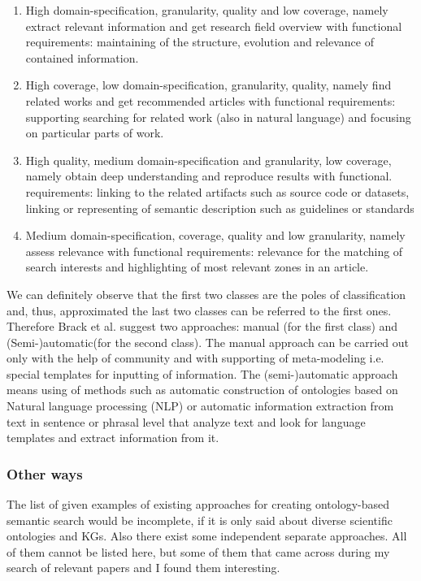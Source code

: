 			\begin{enumerate}
				\item High domain-specification, granularity, quality and low coverage, namely extract relevant information and get research field overview with functional requirements: maintaining of the structure, evolution and relevance of contained information.  
				\item High coverage, low domain-specification, granularity, quality, namely find related works and get recommended articles with functional requirements: supporting searching for related work (also in natural language) and focusing on particular parts of work. 
				\item High quality, medium domain-specification and granularity, low coverage, namely obtain deep understanding and reproduce results with functional. requirements: linking to the related artifacts such as source code or datasets, linking or representing of semantic description such as guidelines or standards
				\item Medium domain-specification, coverage, quality and low granularity, namely assess relevance with functional requirements: relevance for the matching of search interests and highlighting of most relevant zones in an article. 
			\end{enumerate} 
		We can definitely observe that the first two classes are the poles of classification and, thus, approximated the last two classes can be referred to the first ones. Therefore Brack et al. \cite{Bra20} suggest two approaches: manual (for the first class) and (Semi-)automatic(for the second class). The manual approach can be carried out only with the help of community and with supporting of meta-modeling i.e. special templates for inputting of information. The (semi-)automatic approach means using of methods such as automatic construction of ontologies based on Natural language processing (NLP) or automatic information extraction from text in sentence or phrasal level that analyze text and look for language templates and extract information from it.
		
		\subsubsection{Other ways}
		The list of given examples of existing approaches for creating ontology-based semantic search would be incomplete, if it is only said about diverse scientific ontologies and KGs. Also there exist some independent separate approaches. All of them cannot be listed here, but some of them that came across during my search of relevant papers and I found them interesting. 
		
